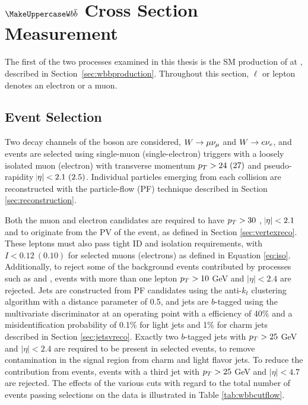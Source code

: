 
\chapter[$\boldsymbol{Wb\overline{b}}$ Cross Section Measurement]{${\expandafter\MakeUppercase W}b\overline{b}$ Cross Section Measurement}\label{sec:wbbxc}

The first of the two processes examined 
 in this thesis is the SM production
 of \ppwbblnbb at  \TeV, described
 in Section~\ref{sec:wbbproduction}.
Throughout this section, $\ell$ or lepton denotes
 an electron or a muon.

\section{Event Selection}

Two decay channels of the \w boson are considered,
 $W\rightarrow \mu\nu_\mu$ and $W\rightarrow e\nu_e$,
 and events are selected using
 single-muon (single-electron) triggers with a
 loosely isolated muon (electron)
 with transverse momentum $p_T>24~(27)$ \GeV
 and pseudo-rapidity $\abs{\eta}<2.1~(2.5)$.
Individual particles emerging from each
 collision are reconstructed with the
 particle-flow (PF) technique described
 in Section \ref{sec:reconstruction}.

Both the muon and electron candidates are required to have 
 $p_T > 30$ \GeV, $\abs{\eta}<2.1$ and
 to originate from the PV of the event,
 as defined in Section \ref{sec:vertexreco}.
These leptons must also pass
 tight ID and isolation requirements,
 with $I < 0.12~(0.10)$ for selected muons
 (electrons) as defined in Equation \ref{eq:iso}.
Additionally, to reject some of the background events
 contributed by processes such as \ppttbar
 and \ppzj, events with more than one 
 lepton {$p_T > 10$} GeV and {$|\eta| < 2.4$}
 are rejected.
Jets are constructed from PF candidates using the
 anti-$k_t$ clustering algorithm \cite{Cacciari:2008gp}
 with a distance parameter of 0.5,
 and jets are $b$-tagged using the multivariate
 discriminator at an operating point
 with a efficiency of 40\% and a misidentification probability of
 0.1\% for light jets and 1\% for charm jets
 described in Section \ref{sec:jetsvreco}.
Exactly two $b$-tagged jets with
 {$p_T > 25$} GeV and {$|\eta| < 2.4$} are required
 to be present in selected events, to 
 remove contamination in the signal region from 
 charm and light flavor jets.
To reduce the contribution from \ppttbar events,
 events  with
 a third jet with {$p_T > 25$} GeV and {$|\eta| < 4.7$}
 are rejected.
The effects of the various cuts with regard to the 
 total number of events passing selections on the data 
 is illustrated in Table \ref{tab:wbbcutflow}.


